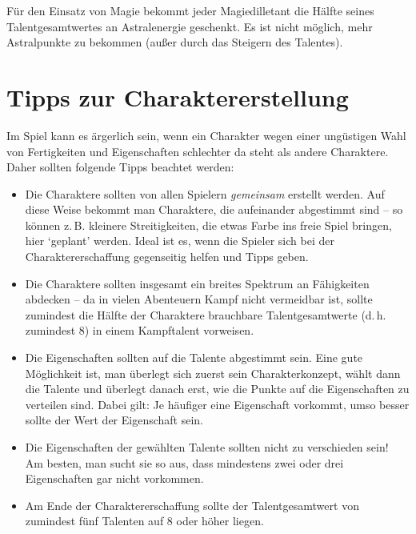 Für den Einsatz von Magie bekommt jeder Magiedilletant die Hälfte seines Talentgesamtwertes an Astralenergie geschenkt. Es ist nicht möglich, mehr Astralpunkte zu bekommen (außer durch das Steigern des Talentes).


\pagebreak[3]
\section{Tipps zur Charaktererstellung}
Im Spiel kann es ärgerlich sein, wenn ein Charakter wegen einer ungüstigen Wahl von Fertigkeiten und Eigenschaften schlechter da steht als andere Charaktere. Daher sollten folgende Tipps beachtet werden:
\begin{itemize}
  \item Die Charaktere sollten von allen Spielern \emph{gemeinsam} erstellt werden. Auf diese Weise bekommt man Charaktere, die aufeinander abgestimmt sind -- so können z.\,B. kleinere Streitigkeiten, die etwas Farbe ins freie Spiel bringen, hier `geplant' werden. Ideal ist es, wenn die Spieler sich bei der Charaktererschaffung gegenseitig helfen und Tipps geben.
  \item Die Charaktere sollten insgesamt ein breites Spektrum an Fähigkeiten abdecken -- da in vielen Abenteuern Kampf nicht vermeidbar ist, sollte zumindest die Hälfte der Charaktere brauchbare Talentgesamtwerte (d.\,h. zumindest 8) in einem Kampftalent vorweisen.
  \item Die Eigenschaften sollten auf die Talente abgestimmt sein. Eine gute Möglichkeit ist, man überlegt sich zuerst sein Charakterkonzept, wählt dann die Talente und überlegt danach erst, wie die Punkte auf die Eigenschaften zu verteilen sind. Dabei gilt: Je häufiger eine Eigenschaft vorkommt, umso besser sollte der Wert der Eigenschaft sein.
  \item Die Eigenschaften der gewählten Talente sollten nicht zu verschieden sein! Am besten, man sucht sie so aus, dass mindestens zwei oder drei Eigenschaften gar nicht vorkommen.
  \item Am Ende der Charaktererschaffung sollte der Talentgesamtwert von zumindest fünf Talenten auf 8 oder höher liegen.
\end{itemize}

